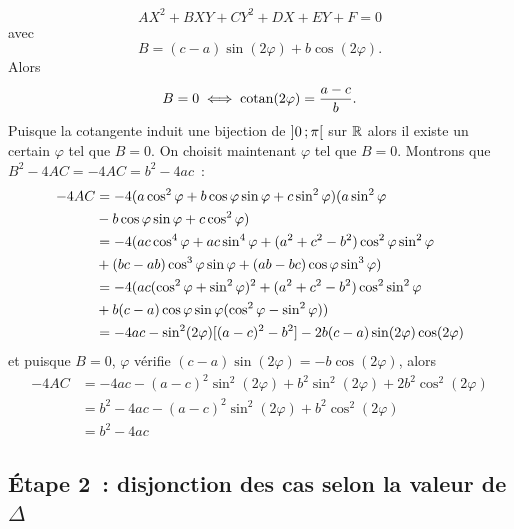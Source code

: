 \begin{equation}
  AX^2+BXY+CY^2+DX+EY+F=0 \label{eq:eqz}
\end{equation}
avec
\begin{equation}
 B=(c-a)\sin(2\varphi)+b\cos(2\varphi).
\end{equation}
Alors
\begin{equation}
 B=0 \iff \operatorname{cotan}(2\varphi)=\frac{a-c}{b}.
\end{equation}
Puisque la cotangente induit une bijection de $\left] 0 \, ;  \pi \right[$ sur $\mathbb{R}$ alors il existe un certain $\varphi$ tel que $B=0$. On choisit maintenant $\varphi$ tel que $B=0$. Montrons que $B^2-4AC=-4AC=b^2-4ac$~:
\begin{align}
  -4AC&=-4(a\cos^2\varphi+b\cos\varphi\sin\varphi +c\sin^2\varphi)(a\sin^2\varphi \\ &- b\cos\varphi\sin\varphi +c\cos^2\varphi) \notag\\
  &=-4(ac\cos^4\varphi + ac\sin^4\varphi+(a^2+c^2-b^2)\cos^2\varphi\sin^2\varphi\\ & +(bc-ab)\cos^3\varphi\sin\varphi+(ab-bc)\cos\varphi\sin^3\varphi) \notag\\
  &=-4(ac(\cos^2\varphi+\sin^2\varphi)^2+(a^2+c^2-b^2)\cos^2\sin^2\varphi \\ & +b(c-a)\cos\varphi\sin\varphi(\cos^2\varphi-\sin^2\varphi)) \notag\\
  &=-4ac-\sin^2(2\varphi)[(a-c)^2-b^2]-2b(c-a)\sin(2\varphi)\cos(2\varphi)
\end{align}
et puisque $B=0$, $\varphi$ vérifie $(c-a)\sin(2\varphi)=-b\cos(2\varphi)$, alors
\begin{align}
  -4AC&=-4ac-(a-c)^2\sin^2(2\varphi)+b^2\sin^2(2\varphi)+2b^2\cos^2(2\varphi)\\
  &=b^2-4ac-(a-c)^2\sin^2(2\varphi)+b^2\cos^2(2\varphi)\\
  &=b^2-4ac
\end{align}

\subsection{Étape 2~: disjonction des cas selon la valeur de $\Delta$}
